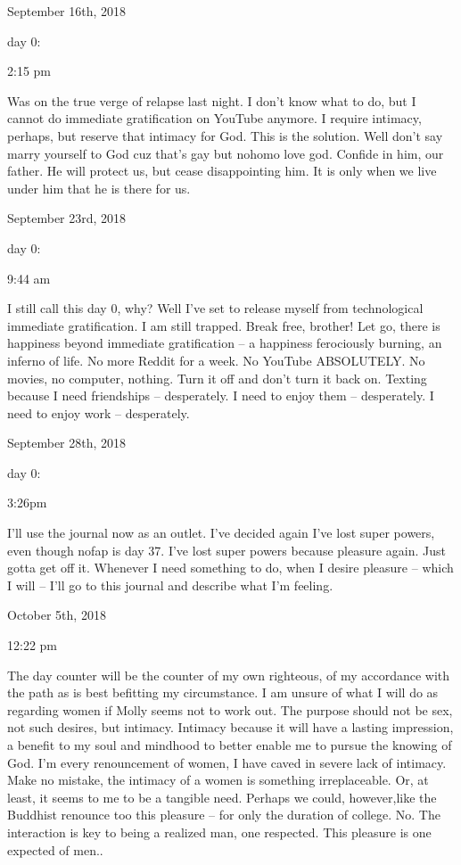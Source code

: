 \bigskip
\bigskip
September 16th, 2018

day 0:

2:15 pm

Was on the true verge of relapse last night. I don't know what to do,
but I cannot do immediate gratification on YouTube anymore. I require
intimacy, perhaps, but reserve that intimacy for God. This is the
solution. Well don't say marry yourself to God cuz that's gay but nohomo
love god. Confide in him, our father. He will protect us, but cease
disappointing him. It is only when we live under him that he is there
for us.

\bigskip
\bigskip
September 23rd, 2018

day 0:

9:44 am

I still call this day 0, why? Well I've set to release myself from
technological immediate gratification. I am still trapped. Break free,
brother! Let go, there is happiness beyond immediate gratification -- a
happiness ferociously burning, an inferno of life. No more Reddit for a
week. No YouTube ABSOLUTELY. No movies, no computer, nothing. Turn it
off and don't turn it back on. Texting because I need friendships --
desperately. I need to enjoy them -- desperately. I need to enjoy work
-- desperately.

\bigskip
\bigskip
September 28th, 2018

day 0:

3:26pm

I'll use the journal now as an outlet. I've decided again I've lost
super powers, even though nofap is day 37. I've lost super powers
because pleasure again. Just gotta get off it. Whenever I need something
to do, when I desire pleasure -- which I will -- I'll go to this journal
and describe what I'm feeling.

\bigskip
\bigskip
October 5th, 2018

12:22 pm

The day counter will be the counter of my own righteous, of my
accordance with the path as is best befitting my circumstance. I am
unsure of what I will do as regarding women if Molly seems not to work
out. The purpose should not be sex, not such desires, but intimacy.
Intimacy because it will have a lasting impression, a benefit to my soul
and mindhood to better enable me to pursue the knowing of God. I'm every
renouncement of women, I have caved in severe lack of intimacy. Make no
mistake, the intimacy of a women is something irreplaceable. Or, at
least, it seems to me to be a tangible need. Perhaps we could,
however,like the Buddhist renounce too this pleasure -- for only the
duration of college. No. The interaction is key to being a realized man,
one respected. This pleasure is one expected of men..

